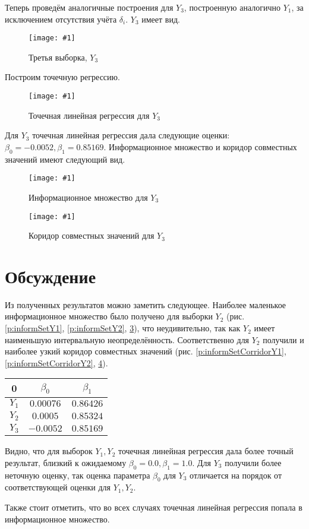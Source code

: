 \documentclass[a4paper,12pt]{article}
\newcommand{\plot}[3]{
    \begin{figure}[H]
        \begin{center}
            \texttt{[image: \#1]}
            \caption{#2}
            \label{#3}
        \end{center}
    \end{figure}
}
\begin{document}
    Теперь проведём аналогичные построения для $ Y_3 $, построенную аналогично $ Y_1 $,
    за исключением отсутствия учёта $ \delta_i $.
    $ Y_3 $ имеет вид.
    \plot{Y3}{Третья выборка, $ Y_3 $}{p:sampleY3}

    Построим точечную регрессию.
    \plot{PointRegressionY3}{Точечная линейная регрессия для $ Y_3 $}{p:regressionY3}

    Для $ Y_3 $ точечная линейная регрессия дала следующие оценки: $ \beta_0 = -0.0052, \beta_1 = 0.85169 $.
    Информационное множество и коридор совместных значений имеют следующий вид.

    \plot{InformSetY3}{Информационное множество для $ Y_3 $}{p:informSetY3}
    \plot{informSetCorridorY3}{Коридор совместных значений для $ Y_3 $}{p:informSetCorridorY3}

    \section{Обсуждение}
    \quad Из полученных результатов можно заметить следующее.
    Наиболее маленькое информационное множество было получено для выборки $ Y_2 $
    (рис. \ref{p:informSetY1}, \ref{p:informSetY2}, \ref{p:informSetY3}),
    что неудивительно, так как $ Y_2 $ имеет наименьшую интервальную неопределённость.
    Соответственно для $ Y_2 $ получили и наиболее узкий коридор совместных значений
    (рис. \ref{p:informSetCorridorY1}, \ref{p:informSetCorridorY2}, \ref{p:informSetCorridorY3}).

    \begin{table}[H]
        \begin{tabular}{| c | c | c |}
            \hline
            0 & $ \beta_0 $ & $ \beta_1 $ \\
            \hline
            $ Y_1 $ & $ 0.00076 $ & $ 0.86426 $ \\
            \hline
            $ Y_2 $ & $ 0.0005 $ & $ 0.85324 $ \\
            \hline
            $ Y_3 $ & $ -0.0052 $ & $ 0.85169 $ \\
            \hline
        \end{tabular}
        \centering
    \end{table}
    
    Видно, что для выборок $ Y_1, Y_2 $ точечная линейная регрессия дала более точный результат,
    близкий к ожидаемому $ \beta_0 = 0.0, \beta_1 = 1.0 $. Для $ Y_3 $ получили более неточную оценку,
    так оценка параметра $ \beta_0 $ для $ Y_3 $ отличается на порядок от соответствующей оценки для $ Y_1, Y_2 $.

    Также стоит отметить, что во всех случаях точечная линейная регрессия попала в информационное множество.
\end{document}
